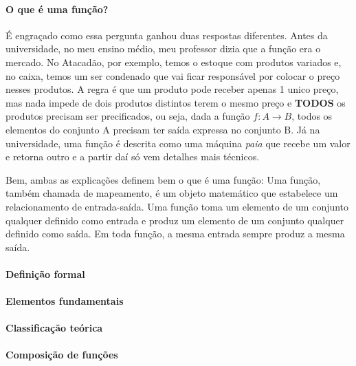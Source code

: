 \documentclass[a4paper,12pt]{article}
\begin{document}
\paragraph{O que é uma função?} É engraçado como essa pergunta ganhou duas respostas diferentes. Antes da universidade, no meu ensino médio, meu professor dizia que a função era o mercado. No Atacadão, por exemplo, temos o estoque com produtos variados e, no caixa, temos um ser condenado que vai 
ficar responsável por colocar o preço nesses produtos. A regra é que um produto pode receber apenas 1 unico preço, mas nada impede de dois produtos distintos terem o mesmo preço e \textbf{TODOS} os produtos precisam ser precificados, ou seja, dada a função $f:A \to B$, todos os elementos do conjunto A
precisam ter saída expressa no conjunto B. Já na universidade, uma função é descrita como uma máquina \textit{paia} que recebe um valor e retorna outro e a partir daí só vem detalhes mais técnicos. 

Bem, ambas as explicações definem bem o que é uma função: Uma função, também chamada de mapeamento, é um objeto matemático que estabelece um relacionamento de entrada-saída. Uma função toma um elemento de um conjunto qualquer definido como entrada e produz um elemento de um conjunto qualquer definido como 
saída. Em toda função, a mesma entrada sempre produz a mesma saída. \cite{sipser}

\paragraph{Definição formal}

% 
% 

\paragraph{Elementos fundamentais} %

\paragraph{Classificação teórica} %

\paragraph{Composição de funções} 
\end{document}
